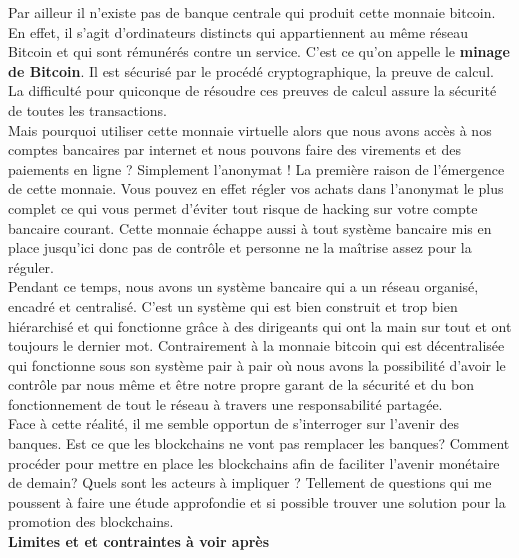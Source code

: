 Par ailleur il n’existe pas de banque centrale qui produit cette monnaie bitcoin. En effet, il s’agit d’ordinateurs distincts qui appartiennent au même réseau Bitcoin et qui sont rémunérés contre un service. C’est ce qu’on appelle le \textbf{minage de Bitcoin}. Il est sécurisé par le procédé cryptographique, la preuve de calcul. La difficulté pour quiconque de résoudre ces preuves de calcul assure la sécurité de toutes les transactions.\\

Mais pourquoi utiliser cette monnaie virtuelle alors que nous avons accès à nos comptes bancaires par internet et nous pouvons faire des virements et des paiements en ligne ?
Simplement l’anonymat ! La première raison de l’émergence de cette monnaie. Vous pouvez en effet régler vos achats dans l’anonymat le plus complet ce qui vous permet d’éviter tout risque de hacking sur votre compte bancaire courant. Cette monnaie échappe aussi à tout système bancaire mis en place jusqu’ici  donc pas de contrôle et personne ne la maîtrise assez pour la réguler.\\

Pendant ce temps, nous avons un système bancaire qui a un réseau organisé, encadré et  centralisé. C’est un système qui est bien construit et trop bien hiérarchisé et qui fonctionne grâce à des dirigeants qui ont la main sur tout et ont toujours le dernier mot. Contrairement à la monnaie bitcoin qui est décentralisée qui fonctionne sous son système pair à pair  où nous avons la possibilité d’avoir le contrôle par nous même et être notre propre garant de la sécurité et du bon fonctionnement de tout le réseau à travers une responsabilité partagée.\\

Face à cette réalité, il me semble opportun de s’interroger sur l’avenir des banques. Est ce que les blockchains ne vont pas remplacer les banques? Comment procéder pour mettre en place les blockchains afin de faciliter l’avenir monétaire de demain? Quels sont les acteurs à impliquer ? Tellement de questions qui me poussent à faire une étude approfondie et si possible trouver une solution pour la promotion des blockchains.\\

\textbf{Limites et et contraintes à voir après}
 

